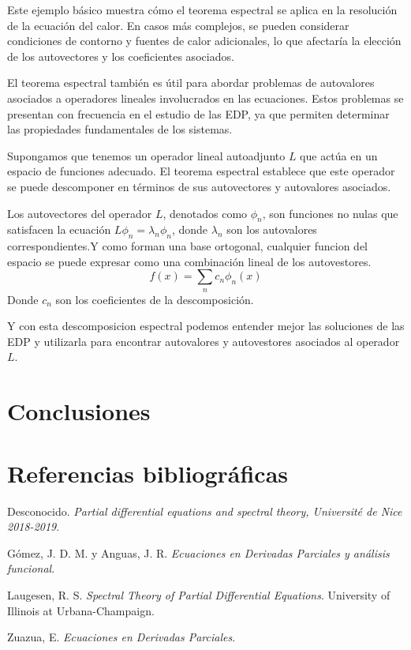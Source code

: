 \documentclass{article}
\begin{document}
    Este ejemplo básico muestra cómo el teorema espectral se aplica en la resolución de la ecuación del calor. En casos más complejos, se pueden considerar condiciones de contorno y fuentes de calor adicionales, lo que afectaría la elección de los autovectores y los coeficientes asociados.


    El teorema espectral también es útil para abordar problemas de autovalores asociados a operadores lineales involucrados en las ecuaciones. Estos problemas se presentan con frecuencia en el estudio de las EDP, ya que permiten determinar las propiedades fundamentales de los sistemas.

    Supongamos que tenemos un operador lineal autoadjunto \(L\) que actúa en un espacio de funciones adecuado. El teorema espectral establece que este operador se puede descomponer en términos de sus autovectores y autovalores asociados.

    Los autovectores del operador \(L\), denotados como \(\phi_n\), son funciones no nulas que satisfacen la ecuación \(L\phi_n = \lambda_n \phi_n\), donde \(\lambda_n\) son los autovalores correspondientes.Y como forman una base ortogonal, cualquier funcion del espacio se puede expresar como una combinación lineal de los autovestores.
    \begin{equation}
    f(x) = \sum_{n} c_n \phi_n(x)
    \end{equation}
    Donde \(c_n\) son los coeficientes de la descomposición.

    Y con esta descomposicion espectral podemos entender mejor las soluciones de las EDP y utilizarla para encontrar autovalores y autovestores asociados al operador \(L\).

\newpage

\section{Conclusiones}
\newpage

\section{Referencias bibliográficas}

\renewcommand{\refname}{}
\begin{thebibliography}{9}

    Desconocido. \emph{Partial differential equations and spectral theory, Université de Nice 2018-2019}.
    
    Gómez, J. D. M. y Anguas, J. R. \emph{Ecuaciones en Derivadas Parciales y análisis funcional}.
    
    Laugesen, R. S. \emph{Spectral Theory of Partial Differential Equations}. University of Illinois at Urbana-Champaign.
    
    Zuazua, E. \emph{Ecuaciones en Derivadas Parciales}.
    
    \end{thebibliography}
\end{document}
